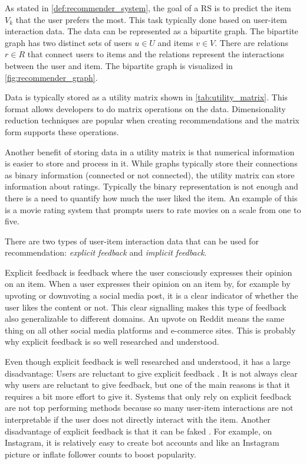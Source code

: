 \documentclass[english, 12pt, a4paper, sci, utf8, a-2b, online]{aaltothesis}
\begin{document}
As stated in \autoref{def:recommender_system}, the goal of a RS is to predict the item $V_k$ that the user prefers the most. This task typically done based on user-item interaction data. The data can be represented as a bipartite graph. The bipartite graph has two distinct sets of users $u \in U$ and items $v \in V$. There are relations $r \in R$ that connect users to items and the relations represent the interactions between the user and item. The bipartite graph is visualized in \autoref{fig:recommender_graph}.

Data is typically stored as a utility matrix shown in \autoref{tab:utility_matrix}. This format allows developers to do matrix operations on the data. Dimensionality reduction techniques are popular when creating recommendations and the matrix form supports these operations. 

Another benefit of storing data in a utility matrix is that numerical information is easier to store and process in it. While graphs typically store their connections as binary information (connected or not connected), the utility matrix can store information about ratings. Typically the binary representation is not enough and there is a need to quantify how much the user liked the item. An example of this is a movie rating system that prompts users to rate movies on a scale from one to five.



There are two types of user-item interaction data that can be used for recommendation: \textit{explicit feedback} and \textit{implicit feedback}.

Explicit feedback is feedback where the user consciously expresses their opinion on an item. When a user expresses their opinion on an item by, for example by upvoting or downvoting a social media post, it is a clear indicator of whether the user likes the content or not. This clear signalling makes this type of feedback also generalizable to different domains. An upvote on Reddit means the same thing on all other social media platforms and e-commerce sites. This is probably why explicit feedback is so well researched and understood. 

Even though explicit feedback is well researched and understood, it has a large disadvantage: Users are reluctant to give explicit feedback \parencite{article_implicit_vs_explicit}. It is not always clear why users are reluctant to give feedback, but one of the main reasons is that it requires a bit more effort to give it. Systems that only rely on explicit feedback are not top performing methods because so many user-item interactions are not interpretable if the user does not directly interact with the item. Another disadvantage of explicit feedback is that it can be faked \parencite{lu2012recommender}. For example, on Instagram, it is relatively easy to create bot accounts and like an Instagram picture or inflate follower counts to boost popularity.
\end{document}
